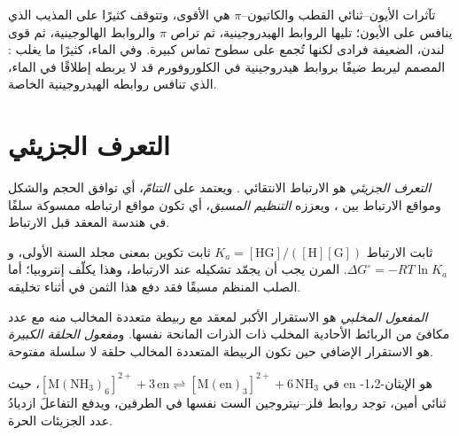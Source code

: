 تآثرات الأيون--ثنائي القطب والكاتيون--$\pi$ هي الأقوى، وتتوقف
كثيرًا على المذيب الذي ينافس على الأيون؛ تليها الروابط الهيدروجينية،
ثم تراص $\pi$ والروابط الهالوجينية، ثم قوى لندن، الضعيفة فرادى لكنها
تُجمع على سطوح تماس كبيرة. وفي الماء، كثيرًا ما يغلب :
 المصمم ليربط ضيفًا بروابط هيدروجينية في الكلوروفورم قد لا
يربطه إطلاقًا في الماء، الذي تنافس روابطه الهيدروجينية الخاصة.

\section{التعرف الجزيئي}

\begin{definition}\label{def:b3:supramolecular:recognition}
\emph{التعرف الجزيئي} هو الارتباط
الانتقائي  . ويعتمد على \emph{التتامّ}،
أي توافق الحجم والشكل ومواقع الارتباط بين  ، 
ويعززه \emph{التنظيم المسبق}، أي  تكون
مواقع ارتباطه ممسوكة سلفًا في هندسة المعقد قبل الارتباط.
\end{definition}

ثابت الارتباط $K_a = [\mathrm{HG}]/([\mathrm H][\mathrm G])$ ثابت تكوين بمعنى
مجلد السنة الأولى، و$\Delta G^\circ = -RT\ln K_a$.  المرن يجب أن يجمّد
تشكيله عند الارتباط، وهذا يكلّف إنتروبيا؛ أما  الصلب المنظم مسبقًا فقد
دفع هذا الثمن في أثناء تخليقه.

\begin{definition}\label{def:b3:supramolecular:macrocyclic}
\emph{المفعول المخلبي} هو الاستقرار الأكبر
لمعقد مع ربيطة متعددة المخالب منه مع عدد مكافئ من
الربائط الأحادية المخلب ذات الذرات المانحة نفسها. و\emph{مفعول الحلقة
الكبيرة} هو الاستقرار الإضافي حين تكون
الربيطة المتعددة المخالب حلقة لا سلسلة مفتوحة.
\end{definition}

\begin{proposition}\label{prop:b3:supramolecular:chelate-entropy}
في $\mathrm{[M(NH_3)_6]^{2+} + 3\,en \rightleftharpoons [M(en)_3]^{2+} + 6\,NH_3}$، حيث en هو الإيثان-1،2-ثنائي أمين، توجد
روابط فلز--نيتروجين الست نفسها في الطرفين، ويدفع التفاعلَ
ازديادُ عدد الجزيئات الحرة.
\end{proposition}

